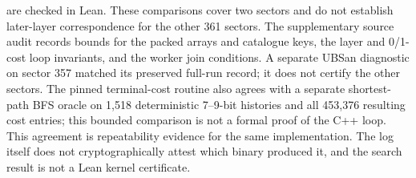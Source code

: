 \documentclass[11pt]{article}
\begin{document}
are checked in Lean. These comparisons cover two sectors and do not
establish later-layer correspondence for the other 361 sectors.
The supplementary source audit records bounds for the packed arrays and
catalogue keys, the layer and 0/1-cost loop invariants, and the worker
join conditions. A separate UBSan diagnostic on sector 357 matched its
preserved full-run record; it does not certify the other sectors.
The pinned terminal-cost routine also agrees with a separate shortest-path
BFS oracle on 1,518 deterministic 7--9-bit histories and all 453,376
resulting cost entries; this bounded comparison is not a formal proof of
the C++ loop.
This agreement is repeatability evidence for the same implementation. The
log itself does not cryptographically attest which binary produced it, and
the search result is not a Lean kernel certificate.
\end{document}
